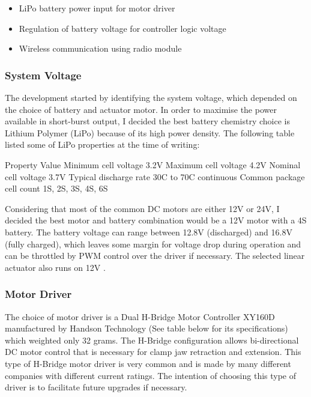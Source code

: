 \begin{itemize}
    \item LiPo battery power input for motor driver
    \item Regulation of battery voltage for controller logic voltage
    \item Wireless communication using radio module
\end{itemize}

\subsubsection{System Voltage}
\label{subsubsection:exploration-1-system-voltage}

The development started by identifying the system voltage, which depended on the choice of battery and actuator motor. In order to maximise the power available in short-burst output, I decided the best battery chemistry choice is Lithium Polymer (LiPo) because of its high power density. The following table listed some of LiPo properties at the time of writing:

Property
Value
Minimum cell voltage
3.2V
Maximum cell voltage
4.2V
Nominal cell voltage
3.7V
Typical discharge rate
30C to 70C continuous
Common package cell count
1S, 2S, 3S, 4S, 6S

Considering that most of the common DC motors are either 12V or 24V, I decided the best motor and battery combination would be a 12V motor with a 4S battery. The battery voltage can range between 12.8V (discharged) and 16.8V (fully charged), which leaves some margin for voltage drop during operation and can be throttled by PWM control over the driver if necessary. The selected linear actuator also runs on 12V .

\subsubsection{Motor Driver}
\label{subsubsection:exploration-1-motor-driver}

The choice of motor driver is a Dual H-Bridge Motor Controller XY160D manufactured by Handson Technology (See table below for its specifications) which weighted only 32 grams. The H-Bridge configuration allows bi-directional DC motor control that is necessary for clamp jaw retraction and extension. This type of H-Bridge motor driver is very common and is made by many different companies with different current ratings. The intention of choosing this type of driver is to facilitate future upgrades if necessary. 

